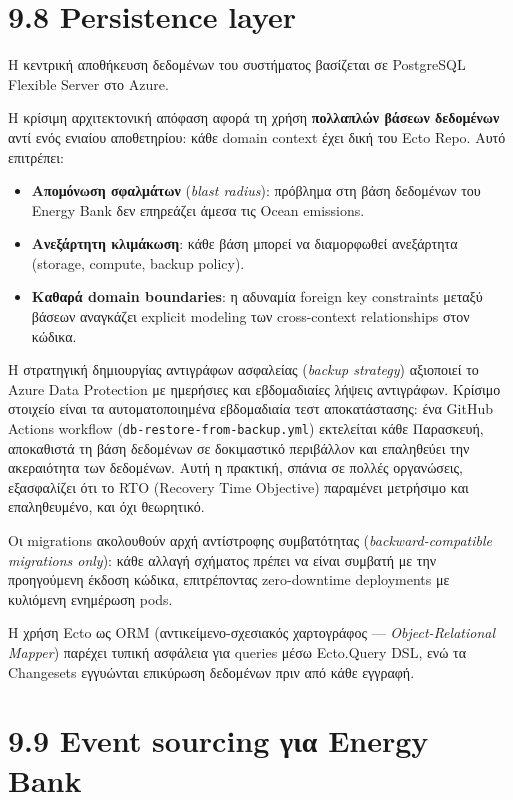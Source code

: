 \section{9.8 Persistence layer}\label{persistence-layer}

Η κεντρική αποθήκευση δεδομένων του συστήματος βασίζεται σε PostgreSQL
Flexible Server στο Azure.

Η κρίσιμη αρχιτεκτονική απόφαση αφορά τη χρήση \textbf{πολλαπλών βάσεων
δεδομένων} αντί ενός ενιαίου αποθετηρίου: κάθε domain context έχει δική
του Ecto Repo. Αυτό επιτρέπει:

\begin{itemize}
\tightlist
\item
  \textbf{Απομόνωση σφαλμάτων} (\emph{blast radius}): πρόβλημα στη βάση
  δεδομένων του Energy Bank δεν επηρεάζει άμεσα τις Ocean emissions.
\item
  \textbf{Ανεξάρτητη κλιμάκωση}: κάθε βάση μπορεί να διαμορφωθεί
  ανεξάρτητα (storage, compute, backup policy).
\item
  \textbf{Καθαρά domain boundaries}: η αδυναμία foreign key constraints
  μεταξύ βάσεων αναγκάζει explicit modeling των cross-context
  relationships στον κώδικα.
\end{itemize}

Η στρατηγική δημιουργίας αντιγράφων ασφαλείας (\emph{backup strategy})
αξιοποιεί το Azure Data Protection με ημερήσιες και εβδομαδιαίες λήψεις
αντιγράφων. Κρίσιμο στοιχείο είναι τα αυτοματοποιημένα εβδομαδιαία τεστ
αποκατάστασης: ένα GitHub Actions workflow
(\texttt{db-restore-from-backup.yml}) εκτελείται κάθε Παρασκευή,
αποκαθιστά τη βάση δεδομένων σε δοκιμαστικό περιβάλλον και επαληθεύει
την ακεραιότητα των δεδομένων. Αυτή η πρακτική, σπάνια σε πολλές
οργανώσεις, εξασφαλίζει ότι το RTO (Recovery Time Objective) παραμένει
μετρήσιμο και επαληθευμένο, και όχι θεωρητικό.

Οι migrations ακολουθούν αρχή αντίστροφης συμβατότητας
(\emph{backward-compatible migrations only}): κάθε αλλαγή σχήματος
πρέπει να είναι συμβατή με την προηγούμενη έκδοση κώδικα, επιτρέποντας
zero-downtime deployments με κυλιόμενη ενημέρωση pods.

Η χρήση Ecto ως ORM (αντικείμενο-σχεσιακός χαρτογράφος ---
\emph{Object-Relational Mapper}) παρέχει τυπική ασφάλεια για queries
μέσω Ecto.Query DSL, ενώ τα Changesets εγγυώνται επικύρωση δεδομένων
πριν από κάθε εγγραφή.

\section{9.9 Event sourcing για Energy
Bank}\label{event-sourcing-ux3b3ux3b9ux3b1-energy-bank}

